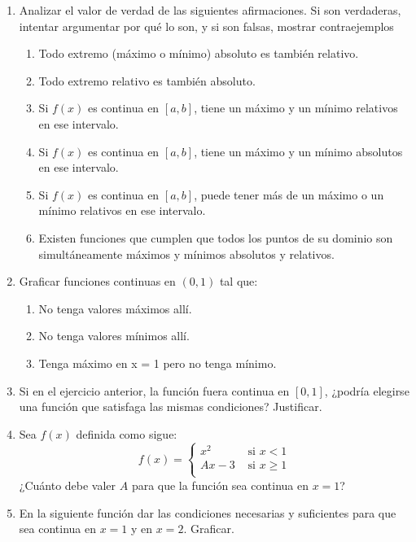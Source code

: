 \documentclass[12pt]{article}
\theoremstyle{definition}
\begin{document}
\begin{enumerate}
\item Analizar el valor de verdad de las siguientes afirmaciones. Si son verdaderas, intentar argumentar por qué lo son, y si son falsas, mostrar contraejemplos
\begin{enumerate}
\item Todo extremo (máximo o mínimo) absoluto es también relativo.
\item Todo extremo relativo es también absoluto.
\item Si $f(x)$ es continua en $[a, b]$, tiene un máximo y un mínimo relativos en ese intervalo.
\item Si $f(x)$ es continua en $[a, b]$, tiene un máximo y un mínimo absolutos en ese intervalo.
\item Si $f(x)$ es continua en $[a, b]$, puede tener más de un máximo o un mínimo relativos en ese intervalo.
\item Existen funciones que cumplen que todos los puntos de su dominio son  simultáneamente máximos y mínimos absolutos y relativos.
\end{enumerate}

\item Graficar funciones continuas en $(0,1)$ tal que:
\begin{enumerate}
\item No tenga valores máximos allí.
\item No tenga valores mínimos allí.
\item Tenga máximo en x = 1 pero no tenga mínimo.
\end{enumerate}
\item Si en el ejercicio anterior,  la función fuera continua en $[0,1]$, ¿podría elegirse una función que satisfaga las mismas condiciones? Justificar.

\item Sea $f(x)$ definida como sigue:  
\begin{equation*}
f(x) =
\begin{cases} 
 x^{2} & \text{  si   } x < 1 \\
Ax-3 & \text{  si   } x \geq 1 \\
\end{cases} 
\end{equation*}
¿Cuánto debe valer $A$ para que la función sea continua en $x = 1$?


\item En la siguiente función dar las condiciones necesarias y suficientes para que sea continua en $x = 1$ y  en $x = 2$. Graficar.


\end{enumerate}
\end{document}
